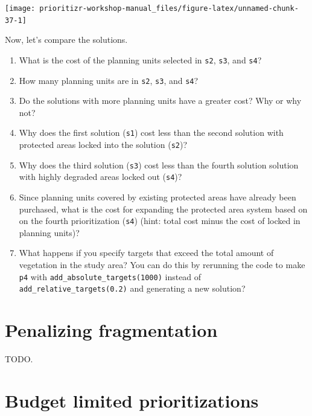 \documentclass[12pt,]{book}
\providecommand{\tightlist}{%
  \setlength{\itemsep}{0pt}\setlength{\parskip}{0pt}}
\let\BeginKnitrBlock\begin \let\EndKnitrBlock\end
\begin{document}
\begin{center}\texttt{[image: prioritizr-workshop-manual\_files/figure-latex/unnamed-chunk-37-1]} \end{center}

Now, let's compare the solutions.

\BeginKnitrBlock{rmdquestion}
\begin{enumerate}
\def\labelenumi{\arabic{enumi}.}
\tightlist
\item
  What is the cost of the planning units selected in \texttt{s2},
  \texttt{s3}, and \texttt{s4}?
\item
  How many planning units are in \texttt{s2}, \texttt{s3}, and
  \texttt{s4}?
\item
  Do the solutions with more planning units have a greater cost? Why or
  why not?
\item
  Why does the first solution (\texttt{s1}) cost less than the second
  solution with protected areas locked into the solution (\texttt{s2})?
\item
  Why does the third solution (\texttt{s3}) cost less than the fourth
  solution solution with highly degraded areas locked out (\texttt{s4})?
\item
  Since planning units covered by existing protected areas have already
  been purchased, what is the cost for expanding the protected area
  system based on on the fourth prioritization (\texttt{s4}) (hint:
  total cost minus the cost of locked in planning units)?
\item
  What happens if you specify targets that exceed the total amount of
  vegetation in the study area? You can do this by rerunning the code to
  make \texttt{p4} with \texttt{add\_absolute\_targets(1000)} instead of
  \texttt{add\_relative\_targets(0.2)} and generating a new solution?
\end{enumerate}
\EndKnitrBlock{rmdquestion}

\section{Penalizing fragmentation}\label{penalizing-fragmentation}

TODO.

\section{Budget limited
prioritizations}\label{budget-limited-prioritizations}
\end{document}
